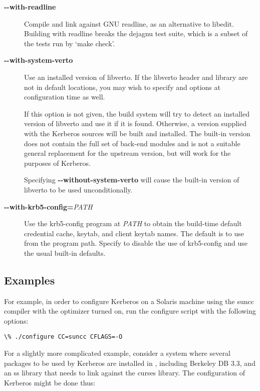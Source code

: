 \documentclass[letterpaper,10pt,english]{sphinxmanual}
\begin{document}
\begin{description}
\item[{\textbf{-}\textbf{-with-readline}}] \leavevmode
Compile and link against GNU readline, as an alternative to libedit.
Building with readline breaks the dejagnu test suite, which is a
subset of the tests run by `make check'.

\item[{\textbf{-}\textbf{-with-system-verto}}] \leavevmode
Use an installed version of libverto.  If the libverto header and
library are not in default locations, you may wish to specify
 and  options
at configuration time as well.

If this option is not given, the build system will try to detect
an installed version of libverto and use it if it is found.
Otherwise, a version supplied with the Kerberos sources will be
built and installed.  The built-in version does not contain the
full set of back-end modules and is not a suitable general
replacement for the upstream version, but will work for the
purposes of Kerberos.

Specifying \textbf{-}\textbf{-without-system-verto} will cause the built-in
version of libverto to be used unconditionally.

\item[{\textbf{-}\textbf{-with-krb5-config=}\emph{PATH}}] \leavevmode
Use the krb5-config program at \emph{PATH} to obtain the build-time
default credential cache, keytab, and client keytab names.  The
default is to use  from the program path.  Specify
 to disable the use of krb5-config and
use the usual built-in defaults.

\end{description}


\subsection{Examples}
\label{build/options2configure:examples}
For example, in order to configure Kerberos on a Solaris machine using
the suncc compiler with the optimizer turned on, run the configure
script with the following options:

\begin{Verbatim}[commandchars=\\\{\}]
\% ./configure CC=suncc CFLAGS=-O
\end{Verbatim}

For a slightly more complicated example, consider a system where
several packages to be used by Kerberos are installed in
, including Berkeley DB 3.3, and an ss library that
needs to link against the curses library.  The configuration of
Kerberos might be done thus:
\end{document}

